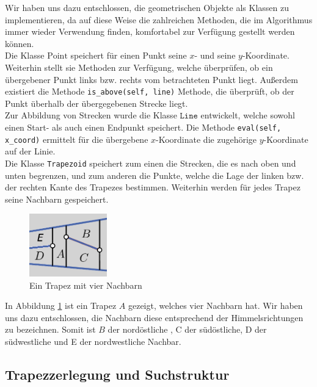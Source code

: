 \documentclass[11pt, a4paper]{article}
\begin{document}
Wir haben uns dazu entschlossen, die geometrischen Objekte als Klassen zu implementieren, da auf diese Weise die zahlreichen Methoden, die im Algorithmus immer wieder Verwendung finden, komfortabel zur Verfügung gestellt werden können.\\
Die Klasse $\text{Point}$ speichert für einen Punkt seine $x$- und seine $y$-Koordinate. Weiterhin stellt sie Methoden zur Verfügung, welche überprüfen, ob ein übergebener Punkt links bzw. rechts vom betrachteten Punkt liegt. Außerdem existiert die Methode \texttt{is\_above(self, line)} Methode, die überprüft, ob der Punkt überhalb der übergegebenen Strecke liegt.\\
Zur Abbildung von Strecken wurde die Klasse $\texttt{Line}$ entwickelt, welche sowohl einen Start- als auch einen Endpunkt speichert. Die Methode 
\texttt{eval(self, x\_coord)} ermittelt für die übergebene $x$-Koordinate die zugehörige $y$-Koordinate auf der Linie.\\
Die Klasse \texttt{Trapezoid} speichert zum einen die Strecken, die es nach oben und unten begrenzen, und zum anderen die Punkte, welche die Lage der linken bzw. der rechten Kante des Trapezes bestimmen. Weiterhin werden für jedes Trapez seine Nachbarn gespeichert.
\begin{figure}[h!]
	\centering
	\includegraphics[width=0.3\textwidth]{neighbors}
	\caption{Ein Trapez mit vier Nachbarn}
	\label{fig:neighbors}
\end{figure}
In Abbildung \ref{fig:neighbors} ist ein Trapez $A$ gezeigt, welches vier Nachbarn hat. Wir haben uns dazu entschlossen, die Nachbarn diese entsprechend der Himmelsrichtungen zu bezeichnen. Somit ist $B$ der nordöstliche , C der südöstliche, D der südwestliche und E der nordwestliche Nachbar.

\subsection{Trapezzerlegung und Suchstruktur}
\end{document}
